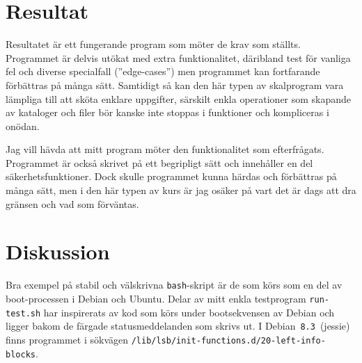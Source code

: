 %
%
%


\section{Resultat}
Resultatet är ett fungerande program som möter de krav som ställts.
Programmet är delvis utökat med extra funktionalitet, däribland test för vanliga
fel och diverse specialfall (''edge-cases'') men programmet kan fortfarande 
förbättras på många sätt. Samtidigt så kan den här typen av skalprogram vara
lämpliga till att sköta enklare uppgifter, särskilt enkla operationer som 
skapande av kataloger och filer bör kanske inte stoppas i funktioner och
kompliceras i onödan.

Jag vill hävda att mitt program möter den funktionalitet som efterfrågats.
Programmet är också skrivet på ett begripligt sätt och innehåller en del
säkerhetsfunktioner. Dock skulle programmet kunna härdas och förbättras på
många sätt, men i den här typen av kurs är jag osäker på vart det är dags 
att dra gränsen och vad som förväntas.


\section{Diskussion}
Bra exempel på stabil och välskrivna \texttt{bash}-skript är de som körs som en
del av boot-processen i Debian och Ubuntu. Delar av mitt enkla testprogram
\texttt{run-test.sh} har inspirerats av kod som körs under bootsekvensen av
Debian och ligger bakom de färgade statusmeddelanden som skrivs ut. I
\mbox{Debian \texttt{8.3} (jessie)} finns programmet i sökvägen
\texttt{/lib/lsb/init-functions.d/20-left-info-blocks}.

